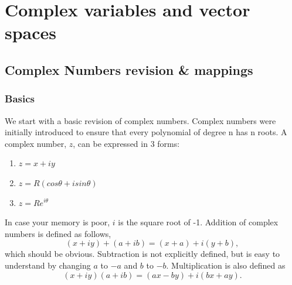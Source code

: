 \chapter{Complex variables and vector spaces}
\minitoc
\pagebreak
\section{Complex Numbers revision \& mappings}
\subsection{Basics}
We start with a basic revision of complex numbers.
 Complex numbers were initially introduced to ensure that every polynomial of degree n has n roots. 
 A complex number, $z$, can be expressed in 3 forms:
%
\begin{enumerate}
	\item $z=x+iy$
	\item $z=R(cos\theta+isin\theta)$
	\item $z=Re^{i\theta}$
\end{enumerate}
%
In case your memory is poor, $i$ is the square root of -1.
 Addition of complex numbers is defined as follows,
 $$ (x+iy) + (a+ib) = (x+a) + i(y+b), $$
 which should be obvious.
 Subtraction is not explicitly defined, but is easy to understand by changing $a$ to $-a$ and $b$ to $-b$.
 Multiplication is also defined as
 $$(x+iy)(a+ib) = (ax-by)+i(bx+ay).$$
%
